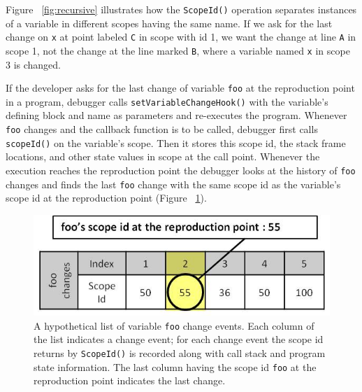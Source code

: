 \documentclass[runningheads,a4paper]{llncs}
\begin{document}
Figure ~\ref{fig:recursive} illustrates how the \texttt{ScopeId()} operation separates instances 
of a variable in different scopes having the same name.
If we ask for the last change on \texttt{x} at point labeled \texttt{C} in scope with id 1, we want the change at line \texttt{A} in scope 1, not 
the change at the line marked \texttt{B}, where a variable named \texttt{x} in scope 3 is changed.  


If the developer asks for the last change of variable \texttt{foo} at the 
reproduction point in a program, debugger calls 
\texttt{setVariableChangeHook()} with the variable's defining
block and name as parameters and re-executes the
program. Whenever \texttt{foo} changes and the callback function is to
be called, debugger first calls \texttt{scopeId()} on the
variable's scope. Then it stores this scope id, the stack
frame locations, and other state values in scope at the call point.
Whenever the execution reaches the reproduction point the debugger
looks at the history of \texttt{foo} changes and finds the last
\texttt{foo} change with the same scope id as the variable's scope id
at the reproduction point (Figure ~\ref{fig:foo-changes2}). 

\begin{figure}[htp]
\centering 
\includegraphics[height=.12\textheight]{7-foo-changes2.jpg}
\caption{A hypothetical list of variable \texttt{foo} change events. Each column of the list indicates a change event; for each
change event the scope id returns by \texttt{ScopeId()} is recorded along with call stack and program state information. 
   The last column having the scope id \texttt{foo} at the reproduction point indicates 
  the last change.}
\label{fig:foo-changes2}
\end{figure}
\end{document}
